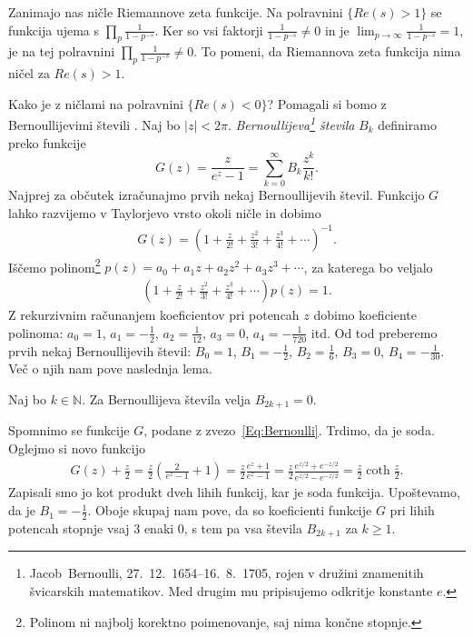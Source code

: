 \documentclass[mat1]{fmfdelo}
\begin{document}
Zanimajo nas ničle Riemannove zeta funkcije. Na polravnini $\{Re(s)>1\}$ se funkcija ujema s $\prod_{p}\frac{1}{1-p^{-s}}$. Ker so vsi faktorji $\frac{1}{1-p^{-s}} \neq 0$ in je $\lim_{p\to\infty} \frac{1}{1-p^{-s}} = 1$, je na tej polravnini $\prod_{p}\frac{1}{1-p^{-s}} \neq 0$. To pomeni, da Riemannova zeta funkcija nima ničel za $Re(s)>1$.

Kako je z ničlami na polravnini $\{Re(s)<0\}$?
Pomagali si bomo z Bernoullijevimi števili \cite[poglavje 3]{bernoulli}. Naj bo $|z|<2\pi$. \emph{Bernoullijeva\footnote{Jacob~Bernoulli, 27.\ 12.\ 1654--16.\ 8.\ 1705, rojen v družini znamenitih švicarskih matematikov. Med drugim mu pripisujemo odkritje konstante $e$.} števila} $B_{k}$ definiramo preko funkcije
\begin{equation}
\label{Eq:Bernoulli}
G(z) = \frac{z}{e^z-1} = \sum_{k=0}^{\infty} B_{k} \frac{z^k}{k!}.
\end{equation}
%
Najprej za občutek izračunajmo prvih nekaj Bernoullijevih števil. Funkcijo $G$ lahko razvijemo v Taylorjevo vrsto okoli ničle in dobimo
\begin{align*}
G(z) = \left(1 + \frac{z}{2!} + \frac{z^2}{3!} + \frac{z^3}{4!} + \cdots \right)^{-1}.
\end{align*}
%
Iščemo polinom\footnote{Polinom ni najbolj korektno poimenovanje, saj nima končne stopnje.} $p(z) = a_{0}+a_{1}z+a_{2}z^2+a_{3}z^3+\cdots$, za katerega bo veljalo
\begin{align*}
\left(1 + \frac{z}{2!} + \frac{z^2}{3!} + \frac{z^3}{4!} + \cdots \right) p(z) = 1.
\end{align*}
%
Z rekurzivnim računanjem koeficientov pri potencah $z$ dobimo koeficiente polinoma: $a_{0}=1$, $a_{1}=-\frac{1}{2}$, $a_{2}=\frac{1}{12}$, $a_{3}=0$, $a_{4}=-\frac{1}{720}$ itd. Od tod preberemo prvih nekaj Bernoullijevih števil: $B_{0} = 1$, $B_{1} = -\frac{1}{2}$,  $B_{2} = \frac{1}{6}$,  $B_{3} = 0$, $B_{4} = -\frac{1}{30}$.
Več o njih nam pove naslednja lema.

\begin{lema}
Naj bo $k \in \mathbb{N}$. Za Bernoullijeva števila velja $B_{2k+1}=0$.
\end{lema}

\begin{dokaz}
Spomnimo se funkcije $G$, podane z zvezo~\eqref{Eq:Bernoulli}. Trdimo, da je soda. Oglejmo si novo funkcijo
\begin{align}
G(z) + \frac{z}{2} = \frac{z}{2} \left( \frac{2}{e^{z}-1}+1 \right) = \frac{z}{2} \frac{e^{z}+1}{e^{z}-1} 
	= \frac{z}{2} \frac{e^{z/2}+e^{-z/2}}{e^{z/2}-e^{-z/2}} = \frac{z}{2} \coth{\frac{z}{2}}.
\end{align}
%
Zapisali smo jo kot produkt dveh lihih funkcij, kar je soda funkcija. Upoštevamo, da je $B_{1}=-\frac{1}{2}$. Oboje skupaj nam pove, da so koeficienti funkcije $G$ pri lihih potencah stopnje vsaj $3$ enaki $0$, s tem pa vsa števila $B_{2k+1}$ za $k \geq 1$.
\end{dokaz}
\end{document}
